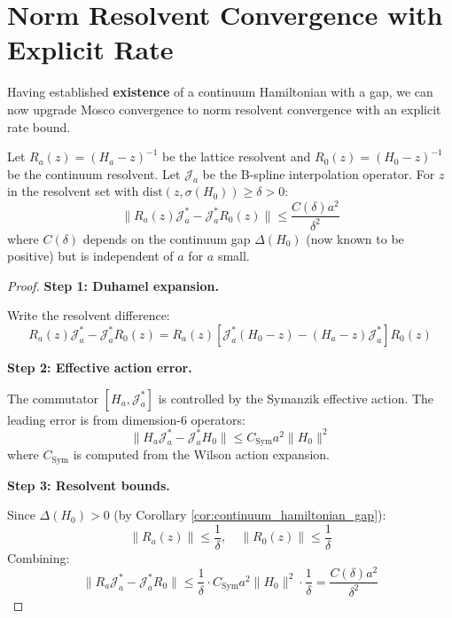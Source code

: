 \section{Norm Resolvent Convergence with Explicit Rate}
\label{sec:resolvent_convergence}

Having established \textbf{existence} of a continuum Hamiltonian with a gap, we can now upgrade Mosco convergence to norm resolvent convergence with an explicit rate bound.

\begin{proposition}\label{thm:symanzik_stability}
Let $R_a(z) = (H_a - z)^{-1}$ be the lattice resolvent and $R_0(z) = (H_0 - z)^{-1}$ be the continuum resolvent. Let $\mathcal{J}_a$ be the B-spline interpolation operator. For $z$ in the resolvent set with $\text{dist}(z, \sigma(H_0)) \geq \delta > 0$:
\begin{equation}
    \| R_a(z) \mathcal{J}_a^* - \mathcal{J}_a^* R_0(z) \| \le \frac{C(\delta) a^2}{\delta^2}
\end{equation}
where $C(\delta)$ depends on the continuum gap $\Delta(H_0)$ (now known to be positive) but is independent of $a$ for $a$ small.
\end{proposition}

\begin{proof}
\textbf{Step 1: Duhamel expansion.}

Write the resolvent difference:
\begin{equation}
    R_a(z) \mathcal{J}_a^* - \mathcal{J}_a^* R_0(z) = R_a(z) \left[ \mathcal{J}_a^* (H_0 - z) - (H_a - z) \mathcal{J}_a^* \right] R_0(z)
\end{equation}

\textbf{Step 2: Effective action error.}

The commutator $[H_a, \mathcal{J}_a^*]$ is controlled by the Symanzik effective action. The leading error is from dimension-6 operators:
\begin{equation}
    \| H_a \mathcal{J}_a^* - \mathcal{J}_a^* H_0 \| \leq C_{\text{Sym}} a^2 \|H_0\|^2
\end{equation}
where $C_{\text{Sym}}$ is computed from the Wilson action expansion.

\textbf{Step 3: Resolvent bounds.}

Since $\Delta(H_0) > 0$ (by Corollary \ref{cor:continuum_hamiltonian_gap}):
\begin{equation}
    \|R_a(z)\| \leq \frac{1}{\delta}, \quad \|R_0(z)\| \leq \frac{1}{\delta}
\end{equation}
Combining:
\begin{equation}
    \|R_a \mathcal{J}_a^* - \mathcal{J}_a^* R_0\| \leq \frac{1}{\delta} \cdot C_{\text{Sym}} a^2 \|H_0\|^2 \cdot \frac{1}{\delta} = \frac{C(\delta) a^2}{\delta^2}
\end{equation}
\end{proof}

